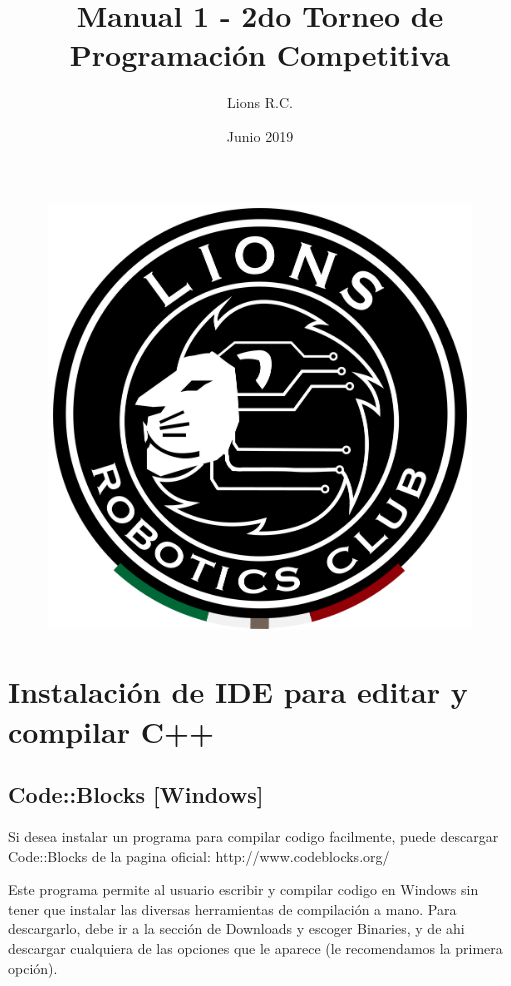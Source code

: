 \documentclass{article}
\title{Manual 1 - 2do Torneo de Programación Competitiva}
\author{Lions R.C.}
\date{Junio 2019}
\begin{document}
\maketitle

\begin{figure}[H]
    \centering
    \includegraphics[width=0.2\paperwidth]{newblack}
\end{figure}

\section{Instalación de IDE para editar y compilar C++}

\subsection{Code::Blocks [Windows]}
Si desea instalar un programa para compilar codigo facilmente, puede descargar Code::Blocks de la pagina oficial: http://www.codeblocks.org/

Este programa permite al usuario escribir y compilar codigo en Windows sin tener que instalar las diversas herramientas de compilación a mano. Para descargarlo, debe ir a la sección de Downloads y escoger Binaries, y de ahi descargar cualquiera de las opciones que le aparece (le recomendamos la primera opción).
\end{document}
